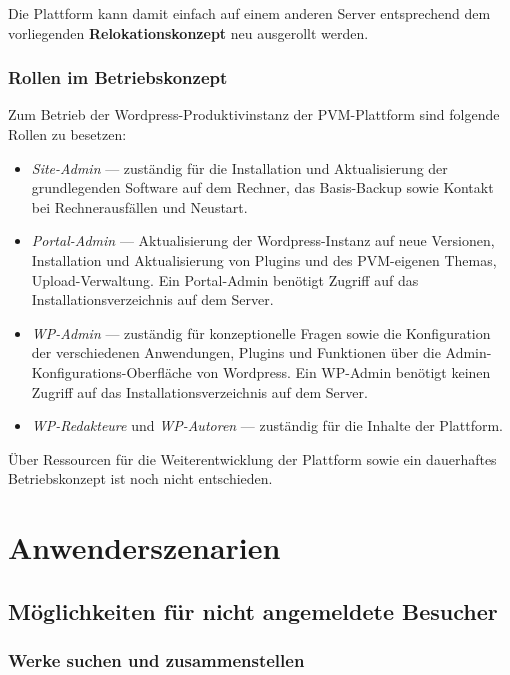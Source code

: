 \documentclass[a4paper,11pt]{article}
\begin{document}
Die Plattform kann damit einfach auf einem anderen Server entsprechend dem
vorliegenden \textbf{Relokationskonzept} neu ausgerollt werden.

\subsubsection{Rollen im Betriebskonzept} 

Zum Betrieb der Wordpress-Produktivinstanz der PVM-Plattform sind folgende
Rollen zu besetzen:
\begin{itemize}
\item \emph{Site-Admin} --- zuständig für die Installation und Aktualisierung
  der grundlegenden Software auf dem Rechner, das Basis-Backup sowie Kontakt
  bei Rechnerausfällen und Neustart.
\item \emph{Portal-Admin} --- Aktualisierung der Wordpress-Instanz auf neue
  Versionen, Installation und Aktualisierung von Plugins und des PVM-eigenen
  Themas, Upload-Verwaltung.  Ein Portal-Admin benötigt Zugriff auf das
  Installationsverzeichnis auf dem Server.
\item \emph{WP-Admin} --- zuständig für konzeptionelle Fragen sowie die
  Konfiguration der verschiedenen Anwendungen, Plugins und Funktionen über die
  Admin-Konfigurations-Oberfläche von Wordpress. Ein WP-Admin benötigt keinen
  Zugriff auf das Installationsverzeichnis auf dem Server.
\item \emph{WP-Redakteure} und \emph{WP-Autoren} --- zuständig für die Inhalte
  der Plattform.
\end{itemize}

Über Ressourcen für die Weiterentwicklung der Plattform sowie ein dauerhaftes
Betriebskonzept ist noch nicht entschieden. 

  

\section{Anwenderszenarien}

\subsection{Möglichkeiten für nicht angemeldete Besucher} 

\subsubsection*{Werke suchen und zusammenstellen}
\end{document}
